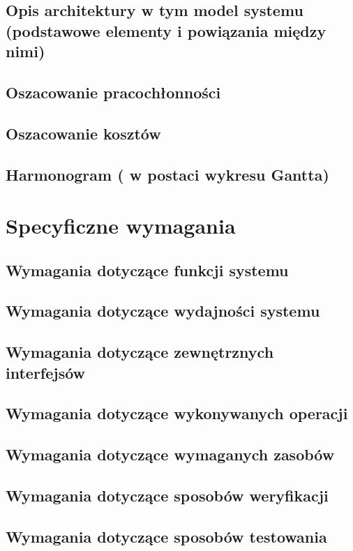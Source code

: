 \documentclass[12pt,a4paper]{report}
\begin{document}
\subsection{Opis architektury w tym model systemu (podstawowe elementy i powiązania między nimi)}
\subsection{Oszacowanie pracochłonności}
\subsection{Oszacowanie kosztów}
\subsection{Harmonogram ( w postaci wykresu Gantta)}
\section{Specyficzne wymagania}
\subsection{Wymagania dotyczące funkcji systemu}
\subsection{Wymagania dotyczące wydajności systemu}
\subsection{Wymagania dotyczące zewnętrznych interfejsów}
\subsection{Wymagania dotyczące wykonywanych operacji}
\subsection{Wymagania dotyczące wymaganych zasobów}
\subsection{Wymagania dotyczące sposobów weryfikacji}
\subsection{Wymagania dotyczące sposobów testowania}
\end{document}
